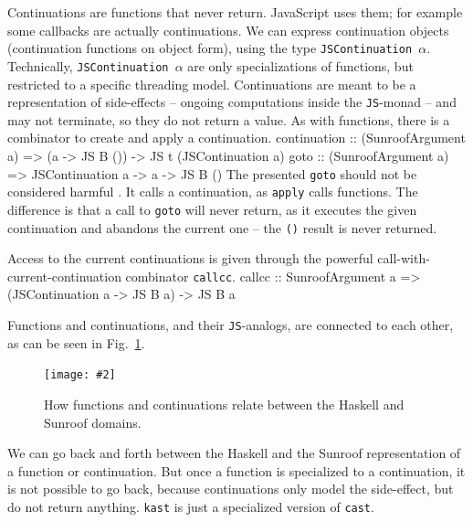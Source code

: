 \documentclass{llncs}
\newcommand{\Src}[1]{{\tt{#1}}}
\newcommand{\JS}{\Src{JS}}
\newcommand{\Figure}[3]{%
\FigureS{#1}{#2}{#3}{scale=0.55,clip=true,trim=0.45cm 0.45cm 0.45cm 0.45cm}
}
\newcommand{\FigureS}[4]{%
\begin{figure}[t]%
\begin{center}%
\texttt{[image: \#2]}%
\vspace{-0.5cm}%
\end{center}%
\caption{#3}%
\label{#1}%
\end{figure}%
}
\newenvironment{Code}{\verbatim}{\endverbatim}
\newcommand{\FigRef}[1]{Fig.~\ref{#1}}
\begin{document}
Continuations are functions that never return. JavaScript uses them; 
for example some callbacks are actually continuations. We can express
continuation objects (continuation functions on object form),
using the type \Src{JSContinuation $\alpha$}.
Technically, \Src{JSContinuation $\alpha$} are only
specializations of functions, but
restricted to a specific threading model. Continuations
are meant to be a representation of side-effects -- 
ongoing computations inside the \JS-monad -- and may  
not terminate, so they do not return a value. As with functions, 
there is a combinator to create and apply a continuation.
\begin{Code}
continuation :: (SunroofArgument a) 
             => (a -> JS B ()) -> JS t (JSContinuation a)
goto         :: (SunroofArgument a) 
             => JSContinuation a -> a -> JS B ()
\end{Code}
The presented \Src{goto} should not be considered 
harmful \cite{Dijkstra:68:GotoConsideredHarmful}.
It calls a continuation,
as \Src{apply} calls functions.
The difference is that a call to \Src{goto} will never
return, as it executes the given continuation and abandons the 
current one -- the \Src{()} result is never returned.

Access to the current continuations is given through
the powerful call-with-current-continuation 
combinator \Src{callcc}.
\begin{Code}
callcc :: SunroofArgument a 
       => (JSContinuation a -> JS B a) -> JS B a
\end{Code}

Functions and continuations, and their \Src{JS}-analogs,
are connected  to each other, as can be seen in \FigRef{fig:func-cont}.
\Figure%
{fig:func-cont}%
{figures/sunroof-func-cont.pdf}%
{How functions and continuations relate between the Haskell and Sunroof domains.}%
We can go back and forth between the Haskell and the Sunroof
representation of a function or continuation. But once a function
is specialized to a continuation, it is not possible to go back,
because continuations only model the side-effect, but do 
not return anything. \Src{kast} is just a specialized version of \Src{cast}.



\end{document}
